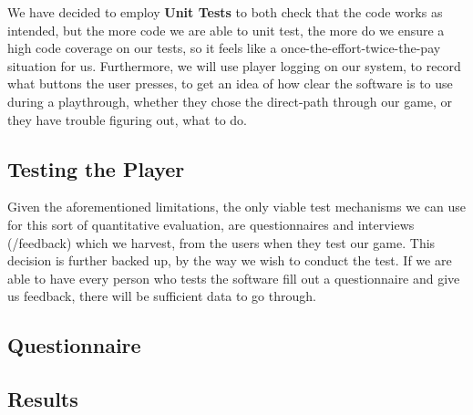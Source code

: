 We have decided to employ \textbf{Unit Tests} to both check that the code works as intended, but the more code we are able to unit test, the more do we ensure a high code coverage on our tests, so it feels like a once-the-effort-twice-the-pay situation for us. Furthermore, we will use player logging on our system, to record what buttons the user presses, to get an idea of how clear the software is to use during a playthrough, whether they chose the direct-path through our game, or they have trouble figuring out, what to do.

\subsection{Testing the Player}

Given the aforementioned limitations, the only viable test mechanisms we can use for this sort of quantitative evaluation, are questionnaires and interviews (/feedback) which we harvest, from the users when they test our game. This decision is further backed up, by the way we wish to conduct the test. If we are able to have every person who tests the software fill out a questionnaire and give us feedback, there will be sufficient data to go through.

\subsection{Questionnaire}

\subsection{Results}